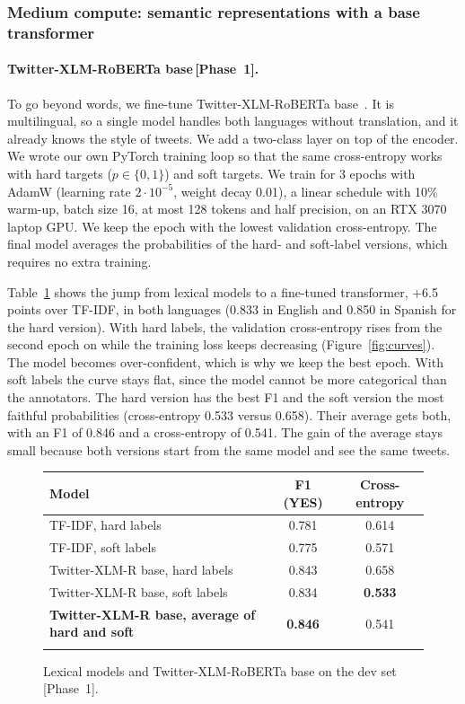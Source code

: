 \documentclass[pdflatex,sn-mathphys-num]{sn-jnl}
\makeatletter
\newenvironment{Htable}{\begin{figure}[H]\def\@captype{table}\begin{center}\begin{threeparttable}\tablebodyfont}{\end{threeparttable}\end{center}\end{figure}}
\newcommand{\Pone}{\,{\normalfont\textsf{\small[Phase~1]}}}
\makeatother
\begin{document}
\subsubsection{Medium compute: semantic representations with a base transformer}\label{sec:medium}

\paragraph{Twitter-XLM-RoBERTa base\Pone.} To go beyond words, we fine-tune Twitter-XLM-RoBERTa base~\cite{barbieri2022xlmt}. It is multilingual, so a single model handles both languages without translation, and it already knows the style of tweets. We add a two-class layer on top of the encoder. We wrote our own PyTorch training loop so that the same cross-entropy works with hard targets ($p \in \{0,1\}$) and soft targets. We train for 3 epochs with AdamW (learning rate $2\cdot10^{-5}$, weight decay 0.01), a linear schedule with 10\% warm-up, batch size 16, at most 128 tokens and half precision, on an RTX 3070 laptop GPU. We keep the epoch with the lowest validation cross-entropy. The final model averages the probabilities of the hard- and soft-label versions, which requires no extra training.

Table~\ref{tab:roberta} shows the jump from lexical models to a fine-tuned transformer, +6.5 points over TF-IDF, in both languages (0.833 in English and 0.850 in Spanish for the hard version). With hard labels, the validation cross-entropy rises from the second epoch on while the training loss keeps decreasing (Figure~\ref{fig:curves}). The model becomes over-confident, which is why we keep the best epoch. With soft labels the curve stays flat, since the model cannot be more categorical than the annotators. The hard version has the best F1 and the soft version the most faithful probabilities (cross-entropy 0.533 versus 0.658). Their average gets both, with an F1 of 0.846 and a cross-entropy of 0.541. The gain of the average stays small because both versions start from the same model and see the same tweets.

\begin{Htable}
\caption{Lexical models and Twitter-XLM-RoBERTa base on the dev set\Pone.}\label{tab:roberta}
\begin{tabular}{@{}lcc@{}}
\toprule
Model & F1 (YES) & Cross-entropy \\
\midrule
TF-IDF, hard labels & 0.781 & 0.614 \\
TF-IDF, soft labels & 0.775 & 0.571 \\
Twitter-XLM-R base, hard labels & 0.843 & 0.658 \\
Twitter-XLM-R base, soft labels & 0.834 & \textbf{0.533} \\
\textbf{Twitter-XLM-R base, average of hard and soft} & \textbf{0.846} & 0.541 \\
\botrule
\end{tabular}
\end{Htable}
\end{document}
